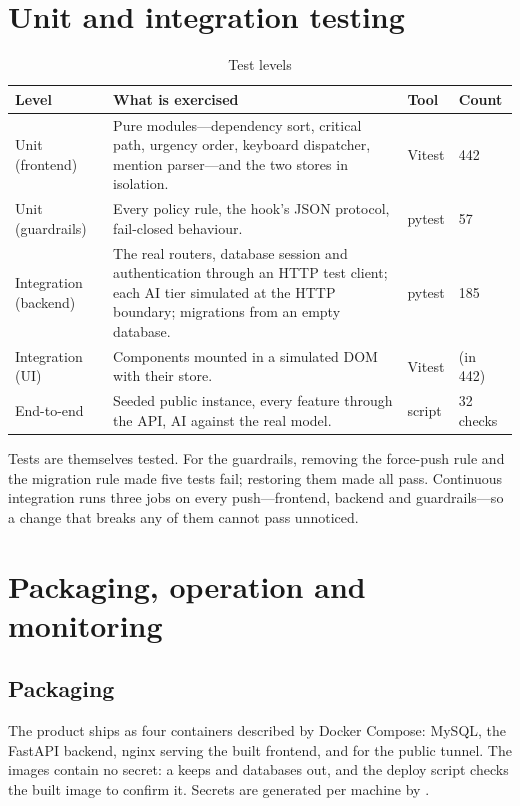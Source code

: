 \documentclass[../main.tex]{subfiles}
\begin{document}
\section{Unit and integration testing}
\begin{table}[H]
\centering
\caption{Test levels}\label{tab:levels}
\renewcommand{\arraystretch}{1.2}
\begin{tabular}{|p{2.5cm}|p{7.6cm}|p{2.0cm}|p{1.5cm}|}
\hline
\textbf{Level} & \textbf{What is exercised} & \textbf{Tool} & \textbf{Count} \\ \hline
Unit (frontend) & Pure modules---dependency sort, critical path, urgency order, keyboard dispatcher, mention parser---and the two stores in isolation. & Vitest & 442 \\ \hline
Unit (guardrails) & Every policy rule, the hook's JSON protocol, fail-closed behaviour. & pytest & 57 \\ \hline
Integration (backend) & The real routers, database session and authentication through an HTTP test client; each AI tier simulated at the HTTP boundary; migrations from an empty database. & pytest & 185 \\ \hline
Integration (UI) & Components mounted in a simulated DOM with their store. & Vitest & (in 442) \\ \hline
End-to-end & Seeded public instance, every feature through the API, AI against the real model. & script & 32 checks \\ \hline
\end{tabular}
\end{table}
Tests are themselves tested. For the guardrails, removing the force-push rule and the migration
rule made five tests fail; restoring them made all pass. Continuous integration runs three jobs on
every push---frontend, backend and guardrails---so a change that breaks any of them cannot pass
unnoticed.

\section{Packaging, operation and monitoring}
\subsection{Packaging}
The product ships as four containers described by Docker Compose: MySQL, the FastAPI backend, nginx
serving the built frontend, and  for the public tunnel. The images contain no
secret: a  keeps  and databases out, and the deploy script checks
the built image to confirm it. Secrets are generated per machine by .
\end{document}
